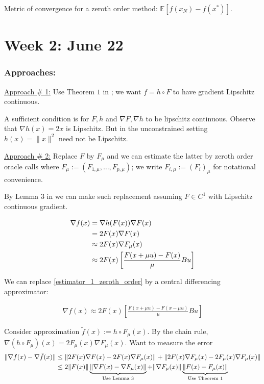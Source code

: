 \documentclass{article}
\begin{document}
Metric of convergence for a zeroth order method: $\mathbb{E}[f(x_N) - f(x^*)]$.

\section{Week 2: June 22}

\subsubsection{Approaches:}

\underline{Approach \# 1:} Use Theorem $1$ in \cite{Nesterov2015}; we want $f = h \circ F$ to have gradient Lipschitz continuous. \newline 

A sufficient condition is for $F,h$ and $\nabla F, \nabla h$ to be lipschitz continuous. Observe that $\nabla h(x) = 2x$ is Lipschitz. But in the unconstrained setting $h(x) = \| x \|^2$ need not be Lipschitz. \newline 

\underline{Approach \# 2:} Replace $F$ by $F_{\mu}$ and we can estimate the latter by zeroth order oracle calls where $F_{\mu}:= (F_{1,\mu},\dots,F_{p,\mu})$; we write $F_{i,\mu}:= (F_i)_{\mu}$ for notational convenience. \newline 

By Lemma $3$ in \cite{Nesterov2015} we can make such replacement assuming $F \in C^1$ with Lipschitz continuous gradient.

\begin{align}
\nabla f(x) & = \nabla h(F(x))\nabla F(x) \notag \\ & = 2F(x)\nabla F(x) \notag  \\ & \approx 2F(x) \nabla F_{\mu}(x) \notag \\ & \approx 2F(x) \left[ \frac{F(x+\mu u) - F(x)}{\mu} Bu \right] \label{estimator_1_zeroth_order}
\end{align}

We can replace \eqref{estimator_1_zeroth_order} by a central differencing approximator: 

\begin{align}
\nabla f(x) \approx 2F(x) \left[ \frac{F(x+\mu u) - F(x-\mu u)}{\mu} Bu \right]
\end{align}

Consider approximation $\tilde{f}(x):=h \circ F_{\mu}(x)$. By the chain rule, $\nabla (h \circ F_{\mu})(x) = 2F_{\mu}(x)\nabla F_{\mu}(x)$. Want to measure the error
\begin{align}
\| \nabla f(x) - \nabla \tilde{f}(x)\| & \leq \| 2F(x)\nabla F(x) - 2F(x)\nabla F_{\mu}(x)\| + \| 2F(x)\nabla F_{\mu}(x) - 2F_{\mu}(x)\nabla F_{\mu}(x) \| \notag \\ & \leq 2\|F(x)\| \underbrace{\|\nabla F(x) - \nabla F_{\mu}(x)\|}_{\text{Use Lemma } 3} + \|\nabla F_{\mu}(x)\| \underbrace{\|F(x) - F_{\mu}(x)\|}_{\text{Use Theorem } 1} \label{error_bound_approach_3}
\end{align}
\end{document}
